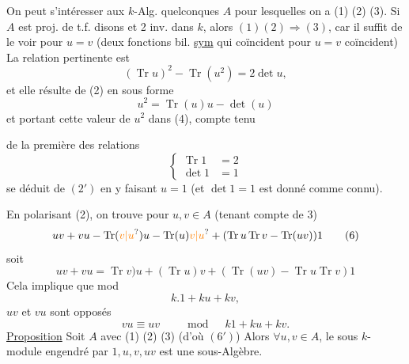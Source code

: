 \uline{} On peut s'intéresser aux $k$-Alg. quelconques $A$ pour lesquelles on a (1) (2) (3). Si $A$ est proj. de t.f. disons et 2 inv. dans $k$, alors $(1)(2)\Longrightarrow(3)$, car il suffit de le voir pour $u=v$ (deux fonctions bil. \uline{sym} qui coïncident pour $u=v$ coïncident)
 La relation pertinente est
\[ (\operatorname{Tr}u)^2-\operatorname{Tr}(u^2)=2\det u, \tag*{(4)} \]
et elle résulte de (2) en  sous forme
\[ u^2=\operatorname{Tr}(u)u-\det(u) \tag*{(2')} \]
et portant cette valeur de $u^2$ dans (4), compte tenu

de la première des relations
\[ \left\{\begin{aligned}\operatorname{Tr}1&=2\\ \det 1&=1\end{aligned}\right. \tag*{(5)} \]
 se déduit  de $(2')$ en y faisant $u=1$ (et $\det 1=1$ est donné comme connu).

En polarisant (2), on trouve pour $u,v\in A$ (tenant compte de 3)
\[ uv+vu-\operatorname{Tr}(\unsure{v|u})u-\operatorname{Tr}(u)\unsure{v|u}+(\operatorname{Tr}u\operatorname{Tr}v-\operatorname{Tr}(uv))1 \tag*{(6)} \]
soit
\[ uv+vu=\operatorname{Tr}v)u+(\operatorname{Tr}u)v+(\operatorname{Tr}(uv)-\operatorname{Tr}u\operatorname{Tr}v)1 \tag*{$(6')$} \]
 Cela  implique que mod
\[ k.1+ku+kv, \]
$uv$ et $vu$ sont  opposés
\[ vu\equiv uv\qquad\bmod\quad k1+ku+kv. \]
\uline{Proposition} Soit $A$ avec (1) (2) (3) (d'où $(6')$) Alors $\forall u,v\in A$,  le sous $k$-module engendré par $1,u,v,uv$ est une sous-Algèbre.

